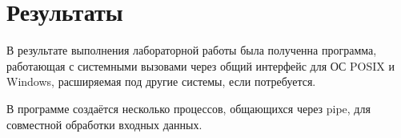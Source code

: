 \section{Результаты}

В результате выполнения лабораторной работы была полученна программа, работающая с системными вызовами через общий интерфейс для ОС POSIX и Windows, расширяемая под другие системы, если потребуется.

В программе создаётся несколько процессов, общающихся через pipe, для совместной обработки входных данных.


